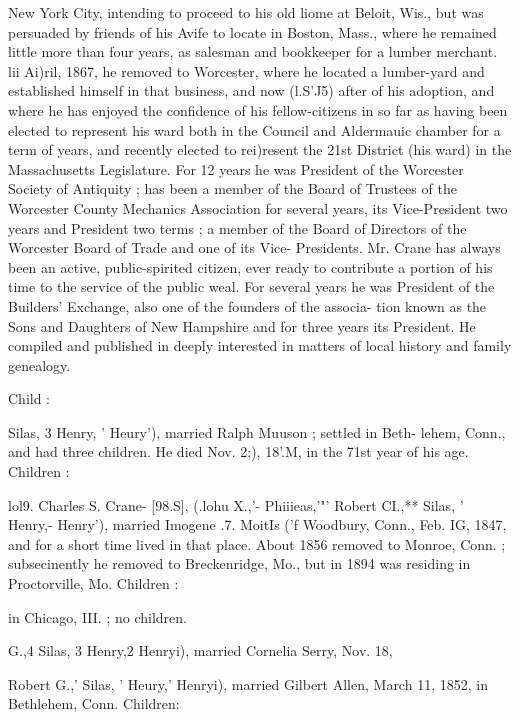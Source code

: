 \documentclass{book}
\begin{document}
New York City, intending to proceed to his old liome at Beloit, 
Wis., but was persuaded by friends of his Avife to locate in 
Boston, Mass., where he remained little more than four years, as 
salesman and bookkeeper for a lumber merchant. lii Ai)ril, 
1867, he removed to Worcester, where he located a lumber-yard 
and established himself in that business, and now (l.S'J5) after 
of his adoption, and where he has enjoyed the confidence of his 
fellow-citizens in so far as having been elected to represent his 
ward both in the Council and Aldermauic chamber for a term of 
years, and recently elected to rei)resent the 21st District (his 
ward) in the Massachusetts Legislature. For 12 years he was 
President of the Worcester Society of Antiquity ; has been a 
member of the Board of Trustees of the Worcester County 
Mechanics Association for several years, its Vice-President two 
years and President two terms ; a member of the Board of 
Directors of the Worcester Board of Trade and one of its Vice- 
Presidents. Mr. Crane has always been an active, public-spirited 
citizen, ever ready to contribute a portion of his time to the 
service of the public weal. For several years he was President 
of the Builders' Exchange, also one of the founders of the associa- 
tion known as the Sons and Daughters of New Hampshire and 
for three years its President. He compiled and published in 
deeply interested in matters of local history and family genealogy. 

Child : 


Silas, 3 Henry, ' Heury'), married Ralph Muuson ; settled in Beth- 
lehem, Conn., and had three children. He died Nov. 2;), 18'.M, 
in the 71st year of his age. Children : 




lol9. Charles S. Crane- [98.S], (.lohu X.,'- Phiiieas,'"' 
Robert CI.,** Silas, ' Henry,- Henry'), married Imogene .7. MoitIs 
('f Woodbury, Conn., Feb. IG, 1847, and for a short time lived in 
that place. About 1856 removed to Monroe, Conn. ; subsecinently 
he removed to Breckenridge, Mo., but in 1894 was residing in 
Proctorville, Mo. Children : 


in Chicago, III. ; no children. 





G.,4 Silas, 3 Henry,2 Henryi), married Cornelia Serry, Nov. 18, 


Robert G.,' Silas, ' Heury,' Henryi), married Gilbert Allen, 
March 11, 1852, in Bethlehem, Conn. Children: 
\end{document}
